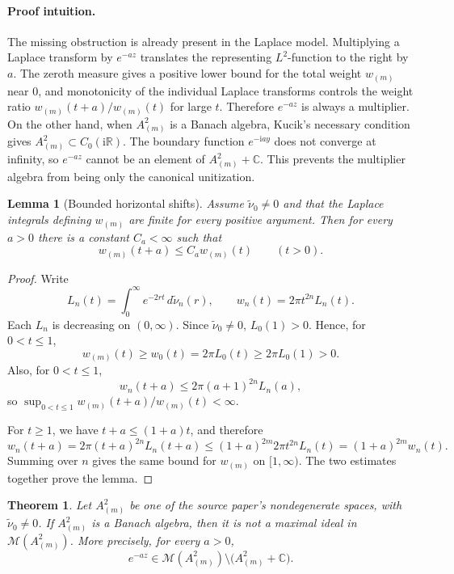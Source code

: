 \documentclass[11pt]{article}
\newtheorem*{theorem}{Theorem}
\newtheorem*{lemma}{Lemma}
\newcommand{\C}{\mathbb C}
\newcommand{\R}{\mathbb R}
\newcommand{\M}{\mathscr M}
\newcommand{\ii}{\mathrm i}
\begin{document}
\paragraph{Proof intuition.}
The missing obstruction is already present in the Laplace model.  Multiplying
a Laplace transform by \(e^{-az}\) translates the representing \(L^2\)-function
to the right by \(a\).  The zeroth measure gives a positive lower bound for
the total weight \(w_{(m)}\) near \(0\), and monotonicity of the individual
Laplace transforms controls the weight ratio \(w_{(m)}(t+a)/w_{(m)}(t)\) for
large \(t\).  Therefore \(e^{-az}\) is always a multiplier.  On the other hand,
when \(A^2_{(m)}\) is a Banach algebra, Kucik's necessary condition gives
\(A^2_{(m)}\subset C_0(\ii\R)\).  The boundary function \(e^{-\ii ay}\) does
not converge at infinity, so \(e^{-az}\) cannot be an element of
\(A^2_{(m)}+\C\).  This prevents the multiplier algebra from being only the
canonical unitization.

\begin{lemma}[Bounded horizontal shifts]
Assume \(\widetilde\nu_0\ne0\) and that the Laplace integrals defining
\(w_{(m)}\) are finite for every positive argument.  Then for every \(a>0\)
there is a constant \(C_a<\infty\) such that
\[
  w_{(m)}(t+a)\le C_a w_{(m)}(t)\qquad(t>0).
\]
\end{lemma}

\begin{proof}
Write
\[
  L_n(t)=\int_0^\infty e^{-2rt}\,d\widetilde\nu_n(r),
  \qquad
  w_n(t)=2\pi t^{2n}L_n(t).
\]
Each \(L_n\) is decreasing on \((0,\infty)\).  Since
\(\widetilde\nu_0\ne0\), \(L_0(1)>0\).  Hence, for \(0<t\le1\),
\[
  w_{(m)}(t)\ge w_0(t)=2\pi L_0(t)\ge 2\pi L_0(1)>0.
\]
Also, for \(0<t\le1\),
\[
  w_n(t+a)\le 2\pi(a+1)^{2n}L_n(a),
\]
so \(\sup_{0<t\le1} w_{(m)}(t+a)/w_{(m)}(t)<\infty\).

For \(t\ge1\), we have \(t+a\le(1+a)t\), and therefore
\[
  w_n(t+a)
  =2\pi(t+a)^{2n}L_n(t+a)
  \le (1+a)^{2m}2\pi t^{2n}L_n(t)
  =(1+a)^{2m}w_n(t).
\]
Summing over \(n\) gives the same bound for \(w_{(m)}\) on \([1,\infty)\).
The two estimates together prove the lemma.
\end{proof}

\begin{theorem}
Let \(A^2_{(m)}\) be one of the source paper's nondegenerate spaces, with
\(\widetilde\nu_0\ne0\).  If \(A^2_{(m)}\) is a Banach algebra, then it is not
a maximal ideal in \(\M(A^2_{(m)})\).  More precisely, for every \(a>0\),
\[
  e^{-az}\in \M(A^2_{(m)})\setminus\bigl(A^2_{(m)}+\C\bigr).
\]
\end{theorem}
\end{document}
